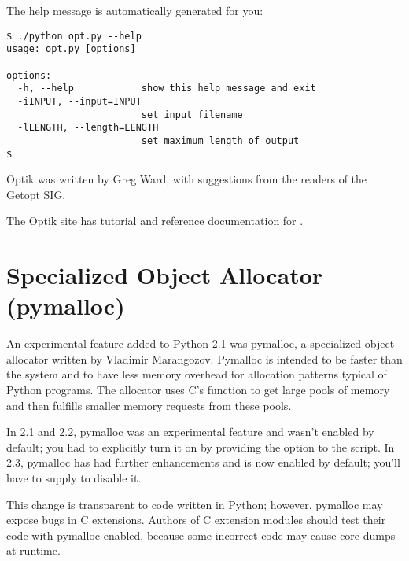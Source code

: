 \documentclass{howto}
\begin{document}
The help message is automatically generated for you:

\begin{verbatim}
$ ./python opt.py --help
usage: opt.py [options]

options:
  -h, --help            show this help message and exit
  -iINPUT, --input=INPUT
                        set input filename
  -lLENGTH, --length=LENGTH
                        set maximum length of output
$ 
\end{verbatim}

Optik was written by Greg Ward, with suggestions from the readers of
the Getopt SIG.

\begin{seealso}
{The Optik site has tutorial and reference documentation for 
.
}
\end{seealso}


\section{Specialized Object Allocator (pymalloc)\label{section-pymalloc}}

An experimental feature added to Python 2.1 was pymalloc, a
specialized object allocator written by Vladimir Marangozov.  Pymalloc
is intended to be faster than the system  and
to have less memory overhead for allocation patterns typical of Python
programs.  The allocator uses C's  function to get
large pools of memory and then fulfills smaller memory requests from
these pools.

In 2.1 and 2.2, pymalloc was an experimental feature and wasn't
enabled by default; you had to explicitly turn it on by providing the
 option to the 
script.  In 2.3, pymalloc has had further enhancements and is now
enabled by default; you'll have to supply
 to disable it.

This change is transparent to code written in Python; however,
pymalloc may expose bugs in C extensions.  Authors of C extension
modules should test their code with pymalloc enabled,
because some incorrect code may cause core dumps at runtime.  
\end{document}
